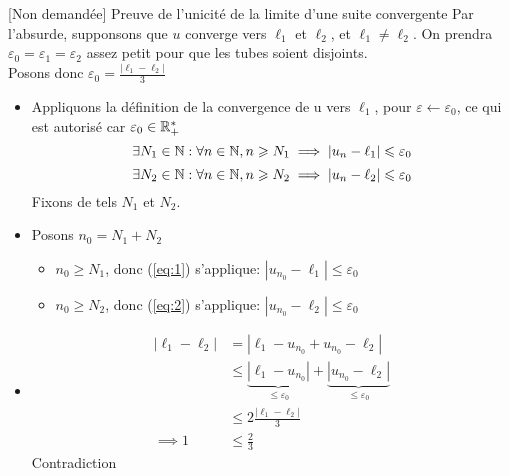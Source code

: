 \documentclass{article}
\begin{document}
\begin{question_kholle}[
		Soit u $\in \K ^ \N, (\ell_1, \ell_2) \in \K ^2$
		Si u converge vers $\ell_1$ et $\ell_2$, alors $\ell_1 = \ell_2$
	]{[Non demandée] Preuve de l'unicité de la limite d'une suite convergente}
	Par l'absurde, supponsons que $u$ converge vers $\ell_1$ et $\ell_2$, et $\ell_1 \neq \ell_2$.
	On prendra $\varepsilon_0 = \varepsilon_1 = \varepsilon_2$ assez petit pour que les tubes soient disjoints.\\
	Posons donc $\varepsilon_0 = \frac{|\ell_1 - \ell_2|}{3}$
	\begin{itemize}
		\item Appliquons la définition de la convergence de u vers $\ell_1$, pour $\varepsilon \leftarrow \varepsilon_0$, ce qui est autorisé car $\varepsilon_0 \in \mathbb R_+^*$
		      \begin{equation}\label{eq:1}
			      \exists N_1 \in \mathbb N : \forall n \in \mathbb N, n \geqslant N_1 \implies |u_n - \ell_1| \leqslant \varepsilon_0
		      \end{equation}
		      \begin{equation}\label{eq:2}
			      \exists N_2 \in \mathbb N : \forall n \in \mathbb N, n \geqslant N_2 \implies |u_n - \ell_2| \leqslant \varepsilon_0
		      \end{equation}
		      Fixons de tels $N_1$ et $N_2$.
		\item Posons $n_0 = N_1 + N_2$
		      \begin{itemize}
			      \item $n_0 \geqslant N_1$, donc (\ref{eq:1}) s'applique: $|u_{n_0} - \ell_1| \leqslant \varepsilon_0$
			      \item $n_0 \geqslant N_2$, donc (\ref{eq:2}) s'applique: $|u_{n_0} - \ell_2| \leqslant \varepsilon_0$
		      \end{itemize}
		\item \begin{align*}
			      |\ell_1 - \ell_2| & = |\ell_1 - u_{n_0} + u_{n_0} - \ell_2|                                                                                         \\
			                        & \leqslant \underbrace{|\ell_1 - u_{n_0}|}_{\leqslant \varepsilon_0} + \underbrace{|u_{n_0} - \ell_2|}_{\leqslant \varepsilon_0} \\
			                        & \leqslant 2 \frac{|\ell_1 - \ell_2|}{3}                                                                                         \\
			      \implies 1        & \leqslant \frac 2 3
		      \end{align*}
		      Contradiction
	\end{itemize}
\end{question_kholle}
\end{document}
